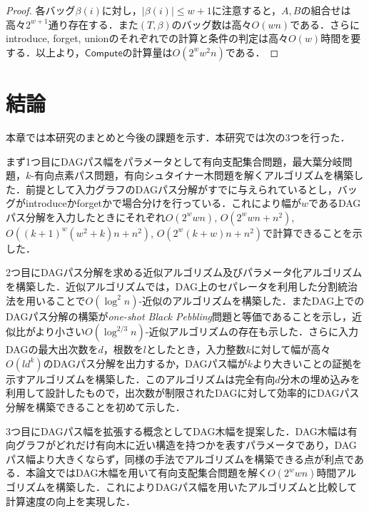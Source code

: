 \documentclass[master]{kuisthesis}		%
\theoremstyle{plain}
\theoremstyle{definition}
\begin{document}
\begin{proof}
    各バッグ$\beta(i)$に対し，$|\beta(i)| \leq w+1$に注意すると，$A, B$の組合せは高々$2^{w+1}$通り存在する．また$(T, \beta)$のバッグ数は高々$O(wn)$である．さらにintroduce, forget, unionのそれぞれでの計算と条件の判定は高々$O(w)$時間を要する．以上より，$\mathsf{Compute}$の計算量は$O(2^ww^2n)$である．
\end{proof}





















\section{結論} %
本章では本研究のまとめと今後の課題を示す．本研究では次の3つを行った．

まず1つ目にDAGパス幅をパラメータとして有向支配集合問題，最大葉分岐問題，$k$-有向点素パス問題，有向シュタイナー木問題を解くアルゴリズムを構築した．前提として入力グラフのDAGパス分解がすでに与えられているとし，バッグがintroduceかforgetかで場合分けを行っている．これにより幅が$w$であるDAGパス分解を入力したときにそれぞれ$O(2^w w n)$, $O(2^w w n + n^2)$, $O((k+1)^w(w^2+k)n+n^2)$, $O(2^w (k + w)n + n^2)$で計算できることを示した．

2つ目にDAGパス分解を求める近似アルゴリズム及びパラメータ化アルゴリズムを構築した．近似アルゴリズムでは，DAG上のセパレータを利用した分割統治法を用いることで$O(\log^2 n)$-近似のアルゴリズムを構築した．またDAG上でのDAGパス分解の構築が\textit{one-shot Black Pebbling}問題と等価であることを示し，近似比がより小さい$O(\log^{2/3} n)$-近似アルゴリズムの存在も示した．さらに入力DAGの最大出次数を$d$，根数を$l$としたとき，入力整数$k$に対して幅が高々$O(ld^k)$のDAGパス分解を出力するか，DAGパス幅が$k$より大きいことの証拠を示すアルゴリズムを構築した．このアルゴリズムは完全有向$d$分木の埋め込みを利用して設計したもので，出次数が制限されたDAGに対して効率的にDAGパス分解を構築できることを初めて示した．

3つ目にDAGパス幅を拡張する概念としてDAG木幅を提案した．DAG木幅は有向グラフがどれだけ有向木に近い構造を持つかを表すパラメータであり，DAGパス幅より大きくならず，同様の手法でアルゴリズムを構築できる点が利点である．本論文ではDAG木幅を用いて有向支配集合問題を解く$O(2^w w n)$時間アルゴリズムを構築した．これによりDAGパス幅を用いたアルゴリズムと比較して計算速度の向上を実現した．
\end{document}
